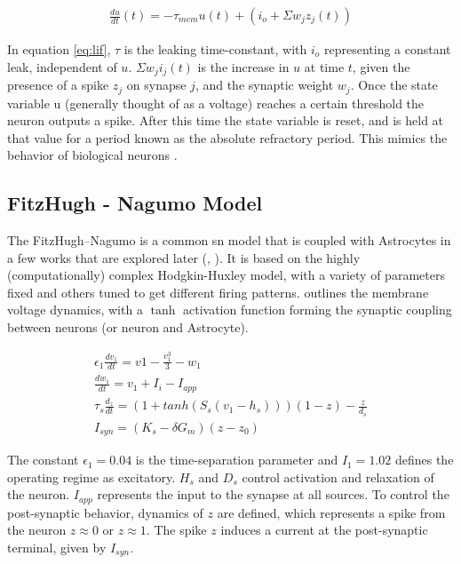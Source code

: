     \begin{align}
        \frac{du}{dt}(t) = -\tau_{mem}u(t)+(i_o + \Sigma w_jz_j(t)) \label{eq:lif}
    \end{align}
    
    In equation \ref{eq:lif}, $\tau$ is the leaking time-constant, with $i_o$
    representing a constant leak, independent of $u$. $\Sigma w_ji_j(t)$ is the
    increase in $u$ at time $t$, given the presence of a spike $z_j$ on synapse
    $j$, and the synaptic weight $w_j$. Once the state variable u (generally
    thought of as a voltage) reaches a certain threshold the neuron outputs a
    spike. After this time the state variable is reset, and is held at that
    value for a period known as the absolute refractory period. This mimics the
    behavior of biological neurons \parencite{ponulak_2011}.



    \subsection{FitzHugh - Nagumo Model}
    The FitzHugh–Nagumo is a common \Gls{sn} model that is coupled with
    Astrocytes in a few works that are explored later (\parencite{postnov_2009},
    \parencite{postnov_2007}). It is based on the highly (computationally) complex
    Hodgkin-Huxley model, with a variety of parameters fixed and others tuned to
    get different firing patterns. \parencite{postnov_2009} outlines the membrane
    voltage dynamics, with a $\tanh$ activation function forming the synaptic
    coupling between neurons (or neuron and Astrocyte).

    \begin{align}
      \epsilon_1 \frac{dv_1}{dt} = v1 - \frac{v_1^3}{3} -
      w_1 \label{eq:fn_neuron}  \\
      \frac{dw_1}{dt} = v_1 + I_i - I_{app} \\
      \tau_s \frac{d_z}{dt} = (1 + tanh(S_s(v_1 - h_s)))(1 - z) - \frac{z}{d_s} \label{eq:fitz_nn}
      \\
      I_{syn} = (K_s - \delta G_m)(z - z_0)
    \end{align}

    The constant $\epsilon_1 = 0.04$ is the time-separation parameter and
    $I_1 = 1.02$ defines the operating regime as excitatory. $H_s$ and $D_s$
    control activation and relaxation of the neuron. $I_{app}$ represents the
    input to the synapse at all sources. To control the post-synaptic behavior,
    dynamics of $z$ are defined, which represents a spike from the neuron
    $z \approx 0$ or $z \approx 1$. The spike $z$ induces a current at the
    post-synaptic terminal, given by $I_{syn}$.

